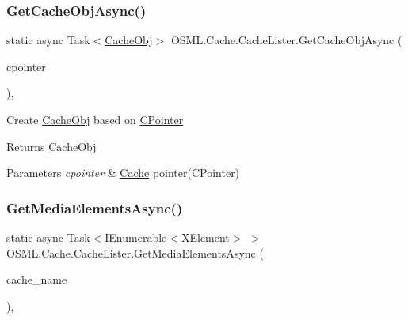 \subsubsection{\texorpdfstring{GetCacheObjAsync()}{GetCacheObjAsync()}}
{\footnotesize\ttfamily static async Task$<$\mbox{\hyperlink{classOSML_1_1Cache_1_1CacheObj}{Cache\+Obj}}$>$ O\+S\+M\+L.\+Cache.\+Cache\+Lister.\+Get\+Cache\+Obj\+Async (\begin{DoxyParamCaption}\item[{\mbox{\hyperlink{classOSML_1_1Cache_1_1CPointer}{C\+Pointer}}}]{cpointer }\end{DoxyParamCaption})\hspace{0.3cm}{\ttfamily [inline]}, {\ttfamily [static]}}



Create \mbox{\hyperlink{classOSML_1_1Cache_1_1CacheObj}{Cache\+Obj}} based on \mbox{\hyperlink{classOSML_1_1Cache_1_1CPointer}{C\+Pointer}} 

\begin{DoxyReturn}{Returns}
\mbox{\hyperlink{classOSML_1_1Cache_1_1CacheObj}{Cache\+Obj}} 
\end{DoxyReturn}

\begin{DoxyParams}{Parameters}
{\em cpointer} & \mbox{\hyperlink{namespaceOSML_1_1Cache}{Cache}} pointer(\+C\+Pointer)\\
\hline
\end{DoxyParams}
\mbox{\label{classOSML_1_1Cache_1_1CacheLister_a57bb277452fb70ba99b67f98c4ec851d}} 
\subsubsection{\texorpdfstring{GetMediaElementsAsync()}{GetMediaElementsAsync()}}
{\footnotesize\ttfamily static async Task$<$I\+Enumerable$<$X\+Element$>$ $>$ O\+S\+M\+L.\+Cache.\+Cache\+Lister.\+Get\+Media\+Elements\+Async (\begin{DoxyParamCaption}\item[{string}]{cache\+\_\+name }\end{DoxyParamCaption})\hspace{0.3cm}{\ttfamily [inline]}, {\ttfamily [static]}}



